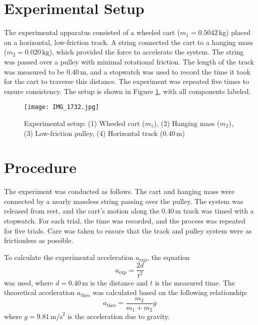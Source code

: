 \documentclass[12pt,twocolumn]{article}
\begin{document}
\section*{Experimental Setup}
The experimental apparatus consisted of a wheeled cart (\( m_1 = 0.5042 \, \text{kg} \)) placed on a horizontal, low-friction track. A string connected the cart to a hanging mass (\( m_2 = 0.020 \, \text{kg} \)), which provided the force to accelerate the system. The string was passed over a pulley with minimal rotational friction. The length of the track was measured to be \( 0.40 \, \text{m} \), and a stopwatch was used to record the time it took for the cart to traverse this distance. The experiment was repeated five times to ensure consistency. The setup is shown in Figure \ref{fig:1}, with all components labeled.

\begin{figure}[H]
    \centering
    \texttt{[image: IMG\_1732.jpg]}
    \caption{Experimental setup: (1) Wheeled cart (\( m_1 \)), (2) Hanging mass (\( m_2 \)), (3) Low-friction pulley, (4) Horizontal track (\( 0.40 \, \text{m} \))}
    \label{fig:1}
\end{figure}

\section*{Procedure}
The experiment was conducted as follows. The cart and hanging mass were connected by a nearly massless string passing over the pulley. The system was released from rest, and the cart’s motion along the \( 0.40 \, \text{m} \) track was timed with a stopwatch. For each trial, the time was recorded, and the process was repeated for five trials. Care was taken to ensure that the track and pulley system were as frictionless as possible.

To calculate the experimental acceleration \( a_{\text{exp}} \), the equation 
\begin{equation}
a_{\text{exp}} = \frac{2d}{t^2}
\end{equation}
was used, where \( d = 0.40 \, \text{m} \) is the distance and \( t \) is the measured time. The theoretical acceleration \( a_{\text{theo}} \) was calculated based on the following relationship:
\begin{equation}
a_{\text{theo}} = \frac{m_2}{m_1 + m_2}g
\end{equation}
where \( g = 9.81 \, \text{m/s}^2 \) is the acceleration due to gravity.
\end{document}
